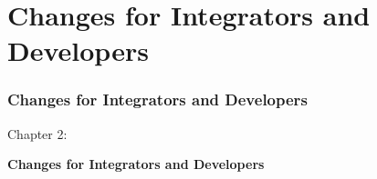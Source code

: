 %

\section{Changes for Integrators and Developers}
\begin{frame}[fragile]
	\frametitle{Changes for Integrators and Developers}

	\begin{center}\huge{Chapter 2:}\end{center}
	\begin{center}\huge{\color{typo3darkgrey}\textbf{Changes for Integrators and Developers}}\end{center}

\end{frame}

